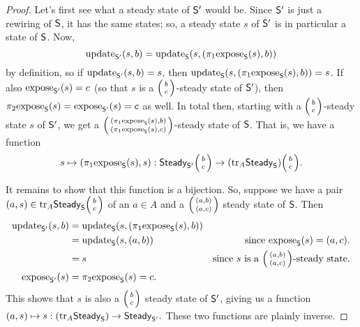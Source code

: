 \documentclass[DynamicalBook]{subfiles}
\begin{document}
\begin{proof}
  Let's first see what a steady state of $\mathsf{S'}$ would be. Since $\mathsf{S'}$
  is just a rewiring of $\mathsf{S}$, it has the same states; so, a steady state $s$ of
  $\mathsf{S'}$ is in particular a state of $\mathsf{S}$. Now,
  $$\mathrm{update}_{\mathsf{S'}}(s,b) = \mathrm{update}_{\mathsf{S}}(s, (\pi_1\mathrm{expose}_{\mathsf{S}}(s), b))$$
  by definition, so if $\mathrm{update}_{\mathsf{S'}}(s, b) = s$, then $\mathrm{update}_{\mathsf{S}}(s, (\pi_1\mathrm{expose}_{\mathsf{S}}(s),
  b)) = s$. If also $\mathrm{expose}_{\mathsf{S'}}(s) = c$ (so that $s$ is a
  $\lens{b}{c}$-steady state of $\mathsf{S'}$), then $\pi_2\mathrm{expose}_{\mathsf{S}}(s) =
  \mathrm{expose}_{\mathsf{S'}}(s) = c$ as well. In total then, starting with a
  $\lens{b}{c}$-steady state $s$ of $\mathsf{S'}$, we get a
  $\lens{(\pi_1\expose{S}(s), b)}{(\pi_1\expose{S}(s), c)}$-steady state of
  $\mathsf{S}$.  That is, we have a function
  $$s \mapsto (\pi_1 \expose{S}(s), s) : \Set{Steady}_{\Sys{S'}}\lens{b}{c} \to
  (\fun{tr}_{A} \Set{Steady}_{\Sys{S}}) \lens{b}{c}.$$

  It remains to show that this function is a bijection. So, suppose we have a
  pair $(a, s) \in \fun{tr}_A \Set{Steady}_{\Sys{S}}\lens{b}{c}$ of an $a \in A$ and a
  $\lens{(a, b)}{(a, c)}$ steady state of $\mathsf{S}$. Then
  \begin{align*}
    \update{S'}(s, b) &= \update{S}(s, (\pi_1\expose{S}(s), b)) \\
                      &= \update{S}(s, (a, b)) &\mbox{since $\expose{S}(s) = (a, c)$.}\\
                      &= s &\mbox{since $s$ is a $\lens{(a, b)}{(a, c)}$-steady state.}\\
    \expose{S'}(s) &= \pi_2\expose{S}(s) = c.
  \end{align*}
  This shows that $s$ is also a $\lens{b}{c}$ steady state of $\mathsf{S'}$, giving
  us a function
  $(a, s) \mapsto s : (\mathrm{tr}_A \mathsf{Steady}_{\mathsf{S}}) \to \mathsf{Steady}_{\mathsf{S'}}.$
  These two functions are plainly inverse.
\end{proof}
\end{document}
